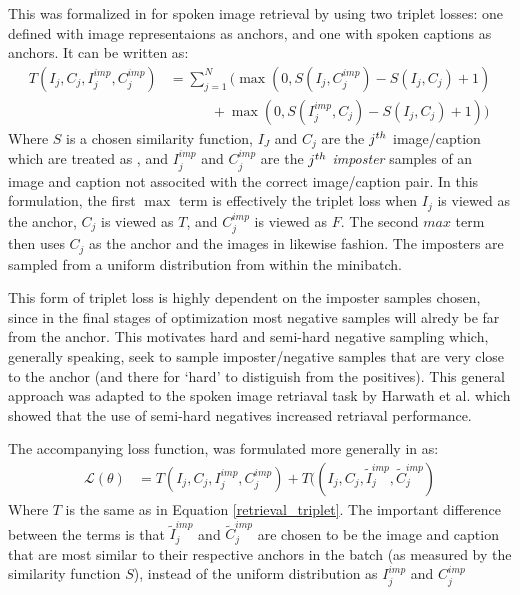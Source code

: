 This was formalized in \cite{harwath2017unsupervised} for spoken image retrieval by using two triplet losses: one defined with image representaions as anchors, and one with spoken captions as anchors.
It can be written as:
\begin{align}
    \label{retrieval_triplet}
    T(I_j, C_j, I_j^{imp}, C_j^{imp}) &= \sum_{j=1}^N \Big(\max(0,S(I_j, C_j^{imp}) - S(I_j, C_j) +1) \\
                                      &{\quad\quad\quad+} \max(0,S(I_j^{imp}, C_j) - S(I_j, C_j) +1)\Big)
\end{align}
Where $S$ is a chosen similarity function,  $I_J$ and $C_j$ are the $j^{th}$  image/caption which are treated as , and $I_j^{imp}$ and $C_j^{imp}$ are the $j^{th}$ \textit{imposter} samples of an image and caption not associted with the correct image/caption pair.
In this formulation, the first $\max$ term is effectively the triplet loss when  $I_j$ is viewed as the anchor, $C_j$ is viewed as $T$, and  $C_j^{imp}$ is viewed as $F$.
The second $max$ term then uses $C_j$ as the anchor and the images in likewise fashion.
The imposters are sampled from a uniform distribution from within the minibatch.

This form of triplet loss is highly dependent on the imposter samples chosen, since in the final stages of optimization most negative samples will alredy be far from the anchor.
This motivates hard and semi-hard negative sampling \cite{jansen2018unsupervised} which, generally speaking, seek to sample imposter/negative samples that are very close to the anchor (and there for `hard' to distiguish from the positives).
This general approach was adapted to the spoken image retriaval task by Harwath et al. \cite{harwath2018jointly} which showed that the use of semi-hard negatives increased retriaval performance.

The accompanying loss function, was formulated more generally in \cite{harwath2019learning} as:
\begin{align}
    \label{eq:triplet_full}
    \mathcal{L}(\theta) &= T(I_j, C_j, I_j^{imp}, C_j^{imp}) + T((I_j, C_j, \tilde{I}_j^{imp}, \tilde{C}_j^{imp})
\end{align}
Where $T$ is the same as in Equation \ref{retrieval_triplet}. 
The important difference between the terms is that $\tilde{I}_j^{imp}$ and $\tilde{C}_j^{imp}$ are chosen to be the image and caption that are most similar to their respective anchors in the batch (as measured by the similarity function $S$),
instead of the uniform distribution as $I_j^{imp}$ and $C_j^{imp}$


